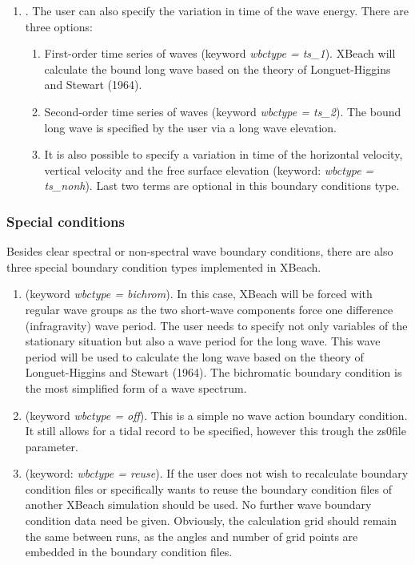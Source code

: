 \documentclass{article}
\begin{document}
\begin{enumerate}
\item  {}. The user can also specify the variation in time of the wave energy. There are three options:

\begin{enumerate}
\item  First-order time series of waves (keyword \textit{wbctype = ts\_1}). XBeach will calculate the bound long wave based on the theory of Longuet-Higgins and Stewart (1964).

\item  Second-order time series of waves (keyword \textit{wbctype = ts\_2}). The bound long wave is specified by the user via a long wave elevation.

\item  It is also possible to specify a variation in time of the horizontal velocity, vertical velocity and the free surface elevation (keyword: \textit{wbctype = ts\_nonh}). Last two terms are optional in this boundary conditions type.  
\end{enumerate}
\end{enumerate}


\subsubsection{ Special conditions}

\noindent Besides clear spectral or non-spectral wave boundary conditions, there are also three special boundary condition types implemented in XBeach.

\noindent 

\begin{enumerate}
\item  {} (keyword \textit{wbctype = bichrom}). In this case, XBeach will be forced with regular wave groups as the two short-wave components force one difference (infragravity) wave period. The user needs to specify not only variables of the stationary situation but also a wave period for the long wave. This wave period will be used to calculate the long wave based on the theory of Longuet-Higgins and Stewart (1964). The bichromatic boundary condition is the most simplified form of a wave spectrum.

\item  {} (keyword \textit{wbctype = off}). This is a simple no wave action boundary condition. It still allows for a tidal record to be specified, however this trough the zs0file parameter.

\item  {} (keyword: \textit{wbctype = reuse}). If the user does not wish to recalculate boundary condition files or specifically wants to reuse the boundary condition files of another XBeach simulation should be used. No further wave boundary condition data need be given. Obviously, the calculation grid should remain the same between runs, as the angles and number of grid points are embedded in the boundary condition files.
\end{enumerate}
\end{document}
